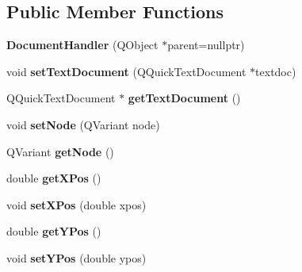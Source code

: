 \subsection*{Public Member Functions}
\begin{DoxyCompactItemize}
\item 
\mbox{\label{classDocumentHandler_abf07f38e288c50a5b154c776e75d8ba7}} 
{\bfseries Document\+Handler} (Q\+Object $\ast$parent=nullptr)
\item 
\mbox{\label{classDocumentHandler_a7d6d1a0cbcc8eb6fcd3f84d2dd082504}} 
void {\bfseries set\+Text\+Document} (Q\+Quick\+Text\+Document $\ast$textdoc)
\item 
\mbox{\label{classDocumentHandler_a0cd35353f607043bec0e2e5d9da2fd60}} 
Q\+Quick\+Text\+Document $\ast$ {\bfseries get\+Text\+Document} ()
\item 
\mbox{\label{classDocumentHandler_aa3ab0c2553bccd2bfea3463cd133b7a4}} 
void {\bfseries set\+Node} (Q\+Variant node)
\item 
\mbox{\label{classDocumentHandler_acd199a4ee29b54c1d23d1046cd2961f0}} 
Q\+Variant {\bfseries get\+Node} ()
\item 
\mbox{\label{classDocumentHandler_a1c107f1f558d56fa8164c7eac47f0411}} 
double {\bfseries get\+X\+Pos} ()
\item 
\mbox{\label{classDocumentHandler_a49dd035721a4252b2930cfa49b53b0d2}} 
void {\bfseries set\+X\+Pos} (double xpos)
\item 
\mbox{\label{classDocumentHandler_a327788c6a3d111e4f8c4b040cde17a78}} 
double {\bfseries get\+Y\+Pos} ()
\item 
\mbox{\label{classDocumentHandler_ad6f687b5df8747329d5885cd43243374}} 
void {\bfseries set\+Y\+Pos} (double ypos)
\end{DoxyCompactItemize}
